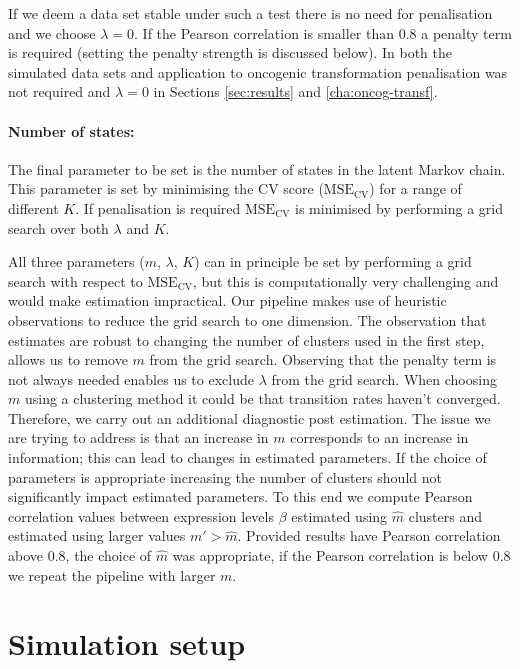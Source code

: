 If we deem a data set stable under such a test there is no need for penalisation and we choose $\lambda=0$. If the Pearson correlation is smaller than $0.8$ a penalty term is required (setting the penalty strength is discussed below). In both the simulated data sets and application to oncogenic transformation penalisation was not required and $\lambda=0$ in Sections \ref{sec:results} and \ref{cha:oncog-transf}.

\paragraph{Number of states:}
\label{sec:number-states}

The final parameter to be set is the number of states in the latent Markov chain. This parameter is set by minimising the CV score ($\mathrm{MSE_{CV}}$) for a range of different $K$. If penalisation is required $\mathrm{MSE_{CV}}$ is minimised by performing a grid search over both $\lambda$ and $K$.

All three parameters ($m$, $\lambda$, $K$) can in principle be set by performing a grid search with respect to $\mathrm{MSE_{CV}}$, but this is computationally very challenging and would make estimation impractical. Our pipeline makes use of heuristic observations to reduce the grid search to one dimension. The observation that estimates are robust to changing the number of clusters used in the first step, allows us to remove $m$ from the grid search. Observing that the penalty term is not always needed enables us to exclude $\lambda$ from the grid search. When choosing $m$ using a clustering method it could be that transition rates haven't converged. Therefore, we carry out an additional diagnostic post estimation. The issue we are trying to address is that an increase in $m$ corresponds to an increase in information; this can lead to changes in estimated parameters. If the choice of parameters is appropriate increasing the number of clusters should not significantly impact estimated parameters. To this end we compute Pearson correlation values between expression levels $\beta$ estimated using $\hat{m}$ clusters and estimated using larger values $m' > \hat{m}$. Provided results have Pearson correlation above $0.8$, the choice of $\hat{m}$ was appropriate, if the Pearson correlation is below $0.8$ we repeat the pipeline with larger $m$.

\section{Simulation setup}
\label{sec:sim-study}

